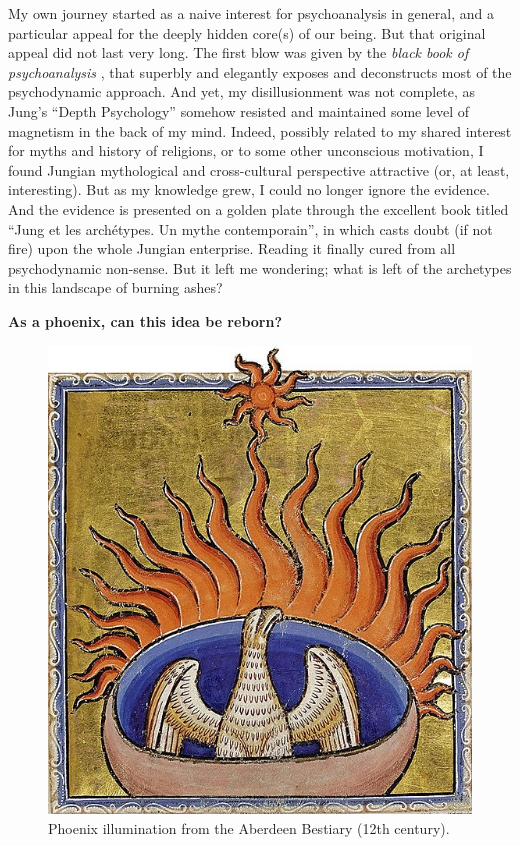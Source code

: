 \documentclass[
]{book}
\begin{document}
My own journey started as a naive interest for psychoanalysis in general, and a particular appeal for the deeply hidden core(s) of our being. But that original appeal did not last very long. The first blow was given by the \emph{black book of psychoanalysis} \citep[``Le livre noir de la psychanalyse'';][]{borch2005livre}, that superbly and elegantly exposes and deconstructs most of the psychodynamic approach. And yet, my disillusionment was not complete, as Jung's ``Depth Psychology'' somehow resisted and maintained some level of magnetism in the back of my mind. Indeed, possibly related to my shared interest for myths and history of religions, or to some other unconscious motivation, I found Jungian mythological and cross-cultural perspective attractive (or, at least, interesting). But as my knowledge grew, I could no longer ignore the evidence. And the evidence is presented on a golden plate through the excellent book titled ``Jung et les archétypes. Un mythe contemporain'', in which \citet{lequellec2013jung} casts doubt (if not fire) upon the whole Jungian enterprise. Reading it finally cured from all psychodynamic non-sense. But it left me wondering; what is left of the archetypes in this landscape of burning ashes?

\textbf{As a phoenix, can this idea be reborn?}

\begin{figure}

{\centering \includegraphics[width=\textwidth]{img/phoenix_aberdeen_bestiary} 

}

\caption{Phoenix illumination from the Aberdeen Bestiary (12th century).}\label{fig:unnamed-chunk-5}
\end{figure}
\end{document}
